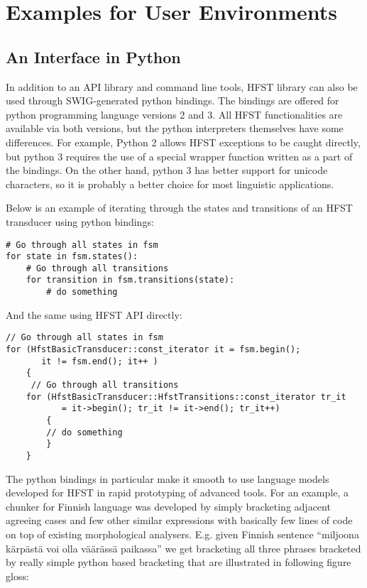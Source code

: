 \documentclass{llncs}
\begin{document}
\section{Examples for User Environments}

\subsection{An Interface in Python}

In addition to an API library and command line tools, HFST library can
also be used through SWIG-generated python bindings. The bindings are
offered for python programming language versions 2 and 3. All HFST
functionalities are available via both versions, but the python
interpreters themselves have some differences. For example, Python 2
allows HFST exceptions to be caught directly, but python 3 requires
the use of a special wrapper function written as a part of the
bindings. On the other hand, python 3 has better support for unicode
characters, so it is probably a better choice for most linguistic
applications.

Below is an example of iterating through the states and transitions of
an HFST transducer using python bindings:

\begin{verbatim}
# Go through all states in fsm       
for state in fsm.states():
    # Go through all transitions                                               
    for transition in fsm.transitions(state):
        # do something
\end{verbatim}

And the same using HFST API directly:

\begin{verbatim}
// Go through all states in fsm
for (HfstBasicTransducer::const_iterator it = fsm.begin();
       it != fsm.end(); it++ )      
    {      
     // Go through all transitions    
    for (HfstBasicTransducer::HfstTransitions::const_iterator tr_it  
           = it->begin(); tr_it != it->end(); tr_it++) 
        {
        // do something
        }
    }
\end{verbatim}

The python bindings in particular make it smooth to use language models
developed for HFST in rapid prototyping of advanced tools. For an example, a
chunker for Finnish language was developed by simply bracketing adjacent
agreeing cases and few other similar expressions with basically few lines of
code on top of existing morphological analysers. E.g.  given Finnish sentence
``miljoona kärpästä voi olla väärässä paikassa'' we get bracketing all three
phrases bracketed by really simple python based bracketing that are illustrated
in following figure gloss:
\end{document}
